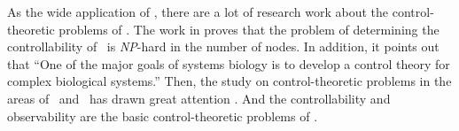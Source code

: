 


      

As the wide application of \BCNs, there are a lot of research work about the control-theoretic problems of \BCNs. The work in \cite{Akutsu2007Control} proves that the problem of determining the controllability of \BCNs\ is {\em NP}-hard in the number of nodes. In addition, it points out that ``One of the major goals of systems biology is to develop a control theory for complex biological systems.'' Then, the study on control-theoretic problems in the areas of \BNs\ and \BCNs\ has drawn great attention \cite{cheng2009controllability, Zhao2010Input, Cheng2011Identification, Cheng2011Analysis,Fornasini2013Observability}. And the controllability and observability are the basic control-theoretic problems of \BCNs. %


